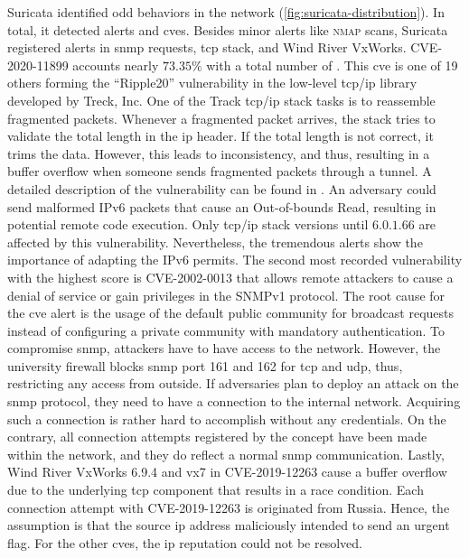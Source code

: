 Suricata identified odd behaviors in the network (\autoref{fig:suricata-distribution}).
In total, it detected  alerts and \acsp{cve}.
Besides minor alerts like \textsc{nmap} scans, Suricata registered alerts in \ac{snmp} requests, \ac{tcp} stack, and Wind River VxWorks.
CVE-2020-11899 \cite{CVE-2020-11899} accounts nearly $73.35\%$ with a total number of .
This \acs{cve} is one of 19 others forming the \enquote{Ripple20} vulnerability in the low-level \ac{tcp}/\ac{ip} library developed by Treck, Inc.
One of the Track \ac{tcp}/\ac{ip} stack tasks is to reassemble fragmented packets.
Whenever a fragmented packet arrives, the stack tries to validate the total length in the \ac{ip} header.
If the total length is not correct, it trims the data.
However, this leads to inconsistency, and thus, resulting in a buffer overflow when someone sends fragmented packets through a tunnel.
A detailed description of the vulnerability can be found in \cite{ripple20}.
An adversary could send malformed IPv6 packets that cause an Out-of-bounds Read, resulting in potential remote code execution.
Only \ac{tcp}/\ac{ip} stack versions until $6.0.1.66$ are affected by this vulnerability.
Nevertheless, the tremendous alerts show the importance of adapting the IPv6 permits.
The second most recorded vulnerability with the highest score is CVE-2002-0013 \cite{CVE-2002-0013} that allows remote attackers to cause a denial of service or gain privileges in the SNMPv1 protocol.
The root cause for the \acs{cve} alert is the usage of the default public community for broadcast requests instead of configuring a private community with mandatory authentication.
To compromise \ac{snmp}, attackers have to have access to the network.
However, the university firewall blocks \ac{snmp} port 161 and 162 for \ac{tcp} and \ac{udp}, thus, restricting any access from outside.
If adversaries plan to deploy an attack on the \ac{snmp} protocol, they need to have a connection to the internal network.
Acquiring such a connection is rather hard to accomplish without any credentials.
On the contrary, all connection attempts registered by the concept have been made within the network, and they do reflect a normal \ac{snmp} communication.
Lastly, Wind River VxWorks 6.9.4 and vx7 in CVE-2019-12263 \cite{CVE-2019-12263} cause a buffer overflow due to the underlying \ac{tcp} component that results in a race condition.
Each connection attempt with CVE-2019-12263 is originated from Russia.
Hence, the assumption is that the source \ac{ip} address maliciously intended to send an urgent flag.
For the other \acsp{cve}, the \ac{ip} reputation could not be resolved.

